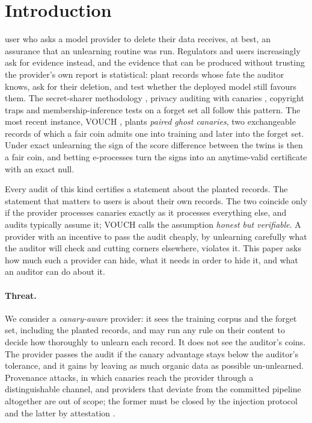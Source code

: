 \section{Introduction}\label{sec:intro}

 user who asks a model provider to delete their data receives, at best, an
assurance that an unlearning routine was run. Regulators and users increasingly ask for
evidence instead, and the evidence that can be produced without trusting the provider's
own report is statistical: plant records whose fate the auditor knows, ask for their
deletion, and test whether the deployed model still favours them. The secret-sharer
methodology \citep{carlini2019secret}, privacy auditing with canaries
\citep{steinke2023privacy}, copyright traps \citep{meeus2024traps} and membership-inference
tests on a forget set \citep{shi2024muse,hayes2024inexact} all follow this pattern. The most
recent instance, VOUCH \citep{dang2026vouch}, plants \emph{paired ghost canaries}, two
exchangeable records of which a fair coin admits one into training and later into the
forget set. Under exact unlearning the sign of the score difference between the twins is
then a fair coin, and betting e-processes turn the signs into an anytime-valid certificate
with an exact null.

Every audit of this kind certifies a statement about the planted records. The statement
that matters to users is about their own records. The two coincide only if the provider
processes canaries exactly as it processes everything else, and audits typically assume
it; VOUCH calls the assumption \emph{honest but verifiable}. A provider with an incentive to
pass the audit cheaply, by unlearning carefully what the auditor will check and cutting
corners elsewhere, violates it. This paper asks how much such a provider can hide, what
it needs in order to hide it, and what an auditor can do about it.

\paragraph{Threat.} We consider a \emph{canary-aware} provider: it sees the training corpus
and the forget set, including the planted records, and may run any rule on their content to
decide how thoroughly to unlearn each record. It does not see the auditor's coins. The
provider passes the audit if the canary advantage stays below the auditor's tolerance, and
it gains by leaving as much organic data as possible un-unlearned. Provenance attacks, in
which canaries reach the provider through a distinguishable channel, and providers that
deviate from the committed pipeline altogether are out of scope; the former must be closed
by the injection protocol and the latter by attestation \citep{eisenhofer2025verifiable}.

